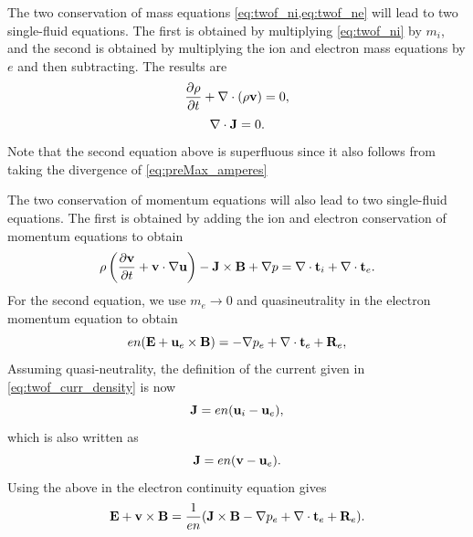 \documentclass[a4paper,11pt]{report}
\begin{document}
The two conservation of mass equations \cref{eq:twof_ni,eq:twof_ne} will lead to two single-fluid equations. The first is obtained by multiplying \cref{eq:twof_ni} by $m_i$, and the second is obtained by multiplying the ion and electron mass equations by $e$ and then subtracting. The results are
\begin{equation}
    \frac{\partial \rho}{\partial t} + \nabla \cdot (\rho \mathbf{v}) = 0,
\end{equation}
\begin{equation}
    \nabla \cdot \mathbf{J} = 0.
\end{equation}
Note that the second equation above is superfluous since it also follows from taking the divergence of \cref{eq:preMax_amperes}

The two conservation of momentum equations will also lead to two single-fluid equations. The first is obtained by adding the ion and electron conservation of momentum equations to obtain
\begin{equation}
\label{eq:generalized_MHD_vel}
    \rho \left (\frac{\partial \mathbf{v}}{\partial t} + \mathbf{v} \cdot \nabla \mathbf{u} \right) - \mathbf{J} \times \mathbf{B} + \nabla p = \nabla \cdot \mathbf{t}_i + \nabla \cdot \mathbf{t}_e.
\end{equation}
For the second equation, we use $m_e \to 0$ and quasineutrality in the electron momentum equation to obtain
\begin{equation}
    e n ( \mathbf{E} + \mathbf{u}_e \times \mathbf{B} ) = - \nabla p_e + \nabla \cdot \mathbf{t}_e + \mathbf{R}_e,
\end{equation}
Assuming quasi-neutrality, the definition of the current given in \cref{eq:twof_curr_density} is now
\begin{equation}
\label{eq:current_def_quasineutral}
    \mathbf{J} = e n (\mathbf{u}_i - \mathbf{u}_e),
\end{equation}
which is also written as
\begin{equation}
    \mathbf{J} = e n (\mathbf{v} - \mathbf{u}_e).
\end{equation}
Using the above in the electron continuity equation gives
\begin{equation}
\label{eq:generalized_MHD_ohms}
    \mathbf{E} + \mathbf{v} \times \mathbf{B} = \frac{1}{en} ( \mathbf{J} \times \mathbf{B} - \nabla p_e + \nabla \cdot \mathbf{t}_e + \mathbf{R}_e).
\end{equation}
\end{document}
